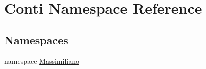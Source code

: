 \hypertarget{namespace_conti}{}\section{Conti Namespace Reference}
\label{namespace_conti}
\subsection*{Namespaces}
\begin{DoxyCompactItemize}
\item 
namespace \hyperlink{namespace_conti_1_1_massimiliano}{Massimiliano}
\end{DoxyCompactItemize}
